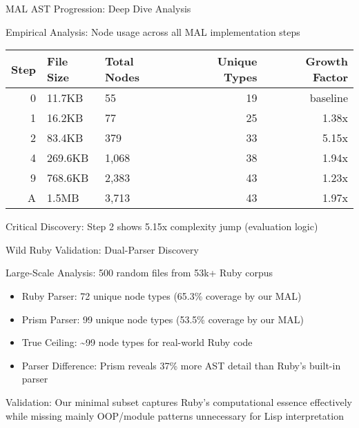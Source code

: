 \documentclass[presentation,aspectratio=169]{beamer}
\begin{document}
\begin{frame}[label={sec:org39277c3}]{MAL AST Progression: Deep Dive Analysis}
\begin{center}
\alert{Empirical Analysis}: Node usage across all MAL implementation steps
\end{center}

\begin{center}
\begin{center}
\begin{tabular}{rllrr}
Step & File Size & Total Nodes & Unique Types & Growth Factor\\
\hline
0 & 11.7KB & 55 & 19 & baseline\\
1 & 16.2KB & 77 & 25 & 1.38x\\
2 & 83.4KB & 379 & 33 & 5.15x\\
4 & 269.6KB & 1,068 & 38 & 1.94x\\
9 & 768.6KB & 2,383 & 43 & 1.23x\\
A & 1.5MB & 3,713 & 43 & 1.97x\\
\end{tabular}
\end{center}
\end{center}

\pause

\alert{Critical Discovery}: Step 2 shows 5.15x complexity jump (evaluation logic)
\end{frame}
\begin{frame}[label={sec:orgf866da9}]{Wild Ruby Validation: Dual-Parser Discovery}
\begin{center}
\alert{Large-Scale Analysis}: 500 random files from 53k+ Ruby corpus
\end{center}

\begin{itemize}[<+->]
\item \alert{Ruby Parser}: 72 unique node types (65.3\% coverage by our MAL)
\item \alert{Prism Parser}: 99 unique node types (53.5\% coverage by our MAL)
\item \alert{True Ceiling}: \textasciitilde{}99 node types for real-world Ruby code
\item \alert{Parser Difference}: Prism reveals 37\% more AST detail than Ruby's built-in parser
\end{itemize}

\pause

\alert{Validation}: Our minimal subset captures Ruby's computational essence effectively while missing mainly OOP/module patterns unnecessary for Lisp interpretation
\end{frame}
\end{document}
